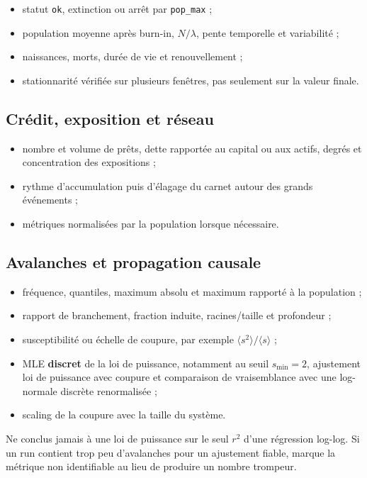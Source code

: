 \documentclass[11pt,a4paper]{article}
\newcommand{\code}[1]{\texttt{\color{navy}#1}}
\newcommand{\term}[1]{\textbf{\color{navy}#1}}
\begin{document}
\begin{itemize}
  \item statut \code{ok}, extinction ou arrêt par \code{pop\_max} ;
  \item population moyenne après burn-in, $N/\lambda$, pente temporelle et
    variabilité ;
  \item naissances, morts, durée de vie et renouvellement ;
  \item stationnarité vérifiée sur plusieurs fenêtres, pas seulement sur la
    valeur finale.
\end{itemize}

\subsection{Crédit, exposition et réseau}

\begin{itemize}
  \item nombre et volume de prêts, dette rapportée au capital ou aux actifs,
    degrés et concentration des expositions ;
  \item rythme d'accumulation puis d'élagage du carnet autour des grands
    événements ;
  \item métriques normalisées par la population lorsque nécessaire.
\end{itemize}

\subsection{Avalanches et propagation causale}

\begin{itemize}
  \item fréquence, quantiles, maximum absolu et maximum rapporté à la
    population ;
  \item rapport de branchement, fraction induite, racines/taille et profondeur ;
  \item susceptibilité ou échelle de coupure, par exemple
    $\langle s^2\rangle/\langle s\rangle$ ;
  \item MLE \term{discret} de la loi de puissance, notamment au seuil
    $s_{\min}=2$, ajustement loi de puissance avec coupure et comparaison de
    vraisemblance avec une log-normale discrète renormalisée ;
  \item scaling de la coupure avec la taille du système.
\end{itemize}

Ne conclus jamais à une loi de puissance sur le seul $r^2$ d'une régression
log-log. Si un run contient trop peu d'avalanches pour un ajustement fiable,
marque la métrique non identifiable au lieu de produire un nombre trompeur.
\end{document}
